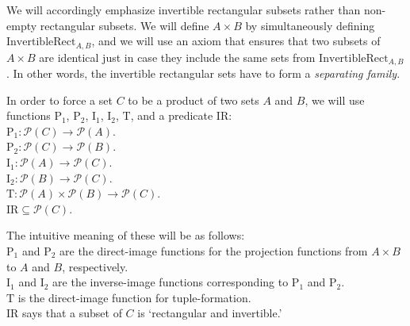 \documentclass[12pt]{book}
\begin{document}
We will accordingly emphasize invertible rectangular subsets rather than non-empty rectangular subsets. We will define $A \times B$ by simultaneously defining $\mathrm{InvertibleRect}_{A, B}$, and we will use an axiom that ensures that two subsets of $A \times B$ are identical just in case they include the same sets from $\mathrm{InvertibleRect}_{A, B}$. In other words, the invertible rectangular sets have to form a \textit{separating family}.

In order to force a set $C$ to be a product of two sets $A$ and $B$, we will use functions $\mathrm{P}_1$, $\mathrm{P}_2$, $\mathrm{I}_1$, $\mathrm{I}_2$, $\mathrm{T}$, and a predicate $\mathrm{IR}$:\\
$\mathrm{P}_1: \mathcal{P}(C) \rightarrow \mathcal{P}(A)$.\\
$\mathrm{P}_2: \mathcal{P}(C) \rightarrow \mathcal{P}(B)$.\\
$\mathrm{I}_1: \mathcal{P}(A) \rightarrow \mathcal{P}(C)$.\\
$\mathrm{I}_2: \mathcal{P}(B) \rightarrow \mathcal{P}(C)$.\\
$\mathrm{T} : \mathcal{P}(A) \times \mathcal{P}(B) \rightarrow \mathcal{P}(C)$.\\ 
$\mathrm{IR} \subseteq \mathcal{P}(C)$.

The intuitive meaning of these will be as follows:\\
\indent * $\mathrm{P}_1$ and $\mathrm{P}_2$ are the direct-image functions for the projection functions from $A \times B$ to $A$ and $B$, respectively.\\
\indent * $\mathrm{I}_1$ and $\mathrm{I}_2$ are the inverse-image functions corresponding to $\mathrm{P}_1$ and $\mathrm{P}_2$.\\
\indent * $\mathrm{T}$ is the direct-image function for tuple-formation.\\
\indent * $\mathrm{IR}$ says that a subset of $C$ is `rectangular and invertible.'
\end{document}
